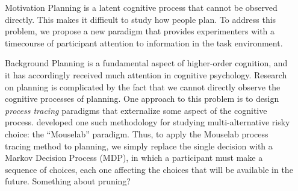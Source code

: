 \documentclass[final]{beamer}
\newlength{\sepwid}
\newlength{\onecolwid}
\begin{document}
\begin{frame}[t, fragile] %
\begin{columns}[t] %
\begin{column}{\sepwid}\end{column} %


\begin{column}{\onecolwid} %
  \begin{block}{Motivation}\label{Motivation}
    Planning is a latent cognitive process that cannot be observed directly. This makes it difficult to study how people plan.
    To address this problem, we propose a new paradigm that provides experimenters with a timecourse of participant attention to information in the task environment.
  \end{block}


  \begin{block}{Background}\label{Background}
    Planning is a fundamental aspect of higher-order cognition, and it has accordingly received much attention in cognitive psychology.
    Research on planning is complicated by the fact that we cannot directly observe the cognitive processes of planning.
    One approach to this problem is to design \emph{process tracing} paradigms that externalize some aspect of the cognitive process.  developed one such methodology for studying multi-alternative risky choice: the ``Mouselab'' paradigm.
    Thus, to apply the Mouselab process tracing method to planning, we simply replace the single decision with a Markov Decision Process (MDP), in which a participant must make a sequence of choices, each one affecting the choices that will be available in the future.
    Something about pruning?
  \end{block}


\end{column}
\end{columns}
\end{frame}
\end{document}
